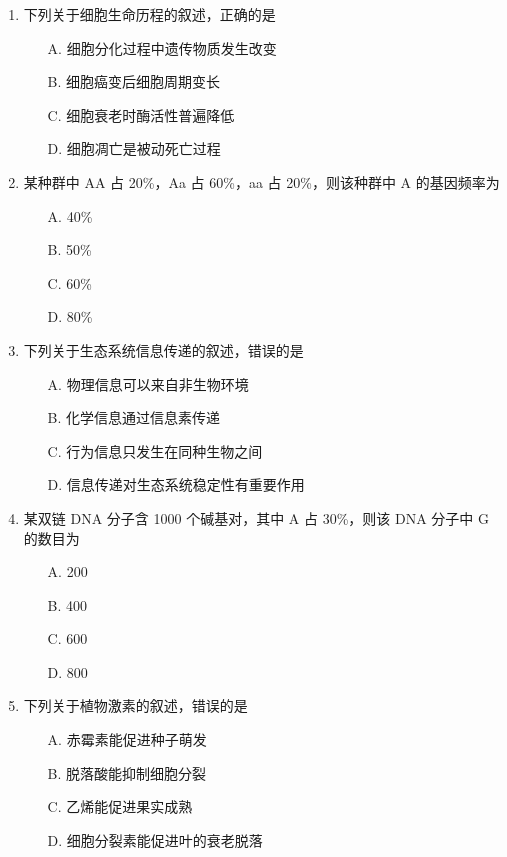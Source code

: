 \begin{enumerate}
  \item 下列关于细胞生命历程的叙述，正确的是
  \begin{enumerate}
    \item[A.] 细胞分化过程中遗传物质发生改变
    \item[B.] 细胞癌变后细胞周期变长
    \item[C.] 细胞衰老时酶活性普遍降低
    \item[D.] 细胞凋亡是被动死亡过程
  \end{enumerate}

  \item 某种群中 AA 占 20\%，Aa 占 60\%，aa 占 20\%，则该种群中 A 的基因频率为
  \begin{enumerate}
    \item[A.] 40\%
    \item[B.] 50\%
    \item[C.] 60\%
    \item[D.] 80\%
  \end{enumerate}

  \item 下列关于生态系统信息传递的叙述，错误的是
  \begin{enumerate}
    \item[A.] 物理信息可以来自非生物环境
    \item[B.] 化学信息通过信息素传递
    \item[C.] 行为信息只发生在同种生物之间
    \item[D.] 信息传递对生态系统稳定性有重要作用
  \end{enumerate}

  \item 某双链 DNA 分子含 1000 个碱基对，其中 A 占 30\%，则该 DNA 分子中 G 的数目为
  \begin{enumerate}
    \item[A.] 200
    \item[B.] 400
    \item[C.] 600
    \item[D.] 800
  \end{enumerate}

  \item 下列关于植物激素的叙述，错误的是
  \begin{enumerate}
    \item[A.] 赤霉素能促进种子萌发
    \item[B.] 脱落酸能抑制细胞分裂
    \item[C.] 乙烯能促进果实成熟
    \item[D.] 细胞分裂素能促进叶的衰老脱落
  \end{enumerate}


\end{enumerate}
